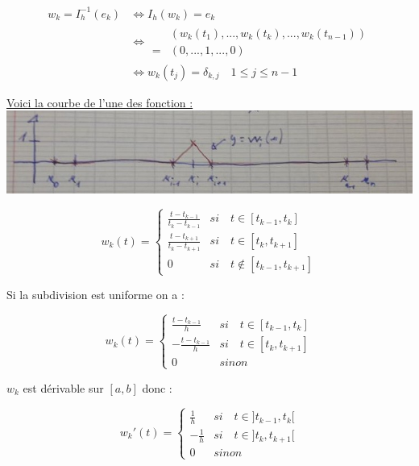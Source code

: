 \documentclass[12pt, letterpaper]{article}
\begin{document}
\begin{enumerate}
  \begin{equation*}
    \begin{split}
      w_k = I_h^{-1}(e_k) & \iff I_h(w_k) = e_k \\
      & \iff
      \begin{split}
        & (w_k(t_1), ..., w_k(t_k), ..., w_k(t_{n-1})) \\
        = & (0, ..., 1, ..., 0)
      \end{split} \\
      & \iff w_k(t_j) = \delta_{k,j} \quad 1 \le j \le n-1
    \end{split}
  \end{equation*}

  \underline{Voici la courbe de l'une des fonction :} \newline
  \includegraphics[scale=0.5]{finite_element.png}

  \begin{equation*}
    w_k(t) = 
    \left\{
    \begin{array}{ll}
      \frac{t - t_{k-1}}{t_k - t_{k-1}} & si \quad t \in [t_{k-1},
        t_k] \\
      \frac{t - t_{k+1}}{t_k - t_{k+1}} & si \quad t \in [t_k,
        t_{k+1}] \\
      0 & si \quad t \notin [t_{k-1}, t_{k+1}]
    \end{array}
    \right.
  \end{equation*}

  Si la subdivision est uniforme on a :

  \begin{equation*}
    w_k(t) = 
    \left\{
    \begin{array}{ll}
      \frac{t - t_{k-1}}{h} & si \quad t \in [t_{k-1},
        t_k] \\
      - \frac{t - t_{k-1}}{h} & si \quad t \in [t_k,
        t_{k+1}] \\
      0 & sinon
    \end{array}
    \right.
  \end{equation*}

  $w_k$ est dérivable sur $[a, b]$ donc :

  \begin{equation*}
    w_k'(t) = 
    \left\{
    \begin{array}{ll}
      \frac{1}{h} & si \quad t \in ]t_{k-1},
        t_k[ \\
      - \frac{1}{h} & si \quad t \in ]t_k,
        t_{k+1}[ \\
      0 & sinon
    \end{array}
    \right.
  \end{equation*}


\end{enumerate}
\end{document}
